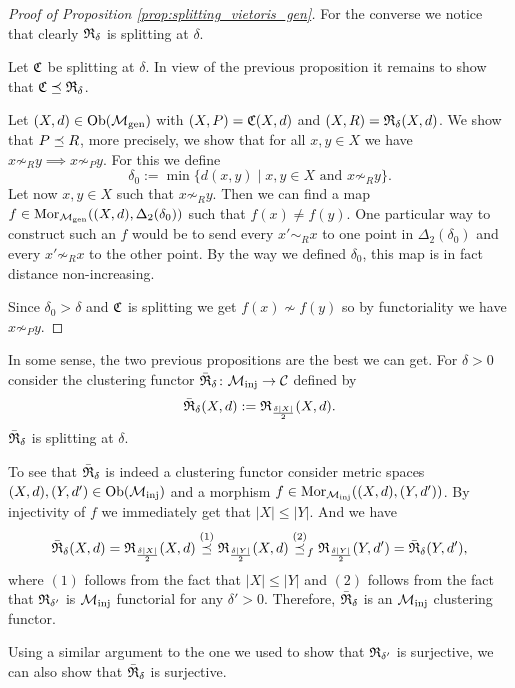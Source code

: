 \begin{proof}[Proof of Proposition \ref{prop:splitting_vietoris_gen}]
    For the converse we notice that clearly $\mathfrak{R}_\delta$ is splitting at $\delta$.

    \medskip
    Let $\mathfrak{C}$ be splitting at $\delta$. In view of the previous proposition it remains to show that $\mathfrak{C} \preceq \mathfrak{R}_\delta$.
        
    Let $(X,d) \in \mathrm {Ob}({\mathcal{M}_\mathrm{gen}})$ with $(X,P) = \mathfrak{C}(X,d)$ and $(X,R) = \mathfrak{R}_\delta(X,d)$. We show that $P \preceq R$, more precisely, we show that for all $x,y \in X$ we have $x \not\sim_R y \implies x \not\sim_P y$. For this we define
    $$
    \delta_0 := \min\{d(x,y) \mid x,y \in X \text{ and } x \not\sim_R y\}.
    $$
    Let now $x,y \in X$ such that $x \not\sim_R y$.
    Then we can find a map $f \in \mathrm {Mor}_{\mathcal{M}_\mathrm{gen}}((X,d), \Delta_2(\delta_0))$ such that $f(x) \neq f(y)$.
    One particular way to construct such an $f$ would be to send every $x' \sim_R x$ to one point in $\Delta_2(\delta_0)$ and every $x' \not\sim_R x$ to the other point. By the way we defined $\delta_0$, this map is in fact distance non-increasing.

    Since $\delta_0 > \delta$ and $\mathfrak{C}$ is splitting we get $f(x) \not\sim f(y)$ so by functoriality we have $x \not\sim_P y$.
\end{proof}


\begin{example}{}{}
In some sense, the two previous propositions are the best we can get.
For $\delta>0$ consider the clustering functor $\bar{\mathfrak{R}}_\delta\colon {\mathcal{M}_\mathrm{inj}} \to \mathcal{C}$ defined by
$$
\bar{\mathfrak{R}}_\delta(X,d) := \mathfrak{R}_{\frac{\delta|X|}{2}}(X,d).
$$
$\bar{\mathfrak{R}}_\delta$ is splitting at $\delta$.

\medskip
To see that $\bar{\mathfrak{R}}_\delta$ is indeed a clustering functor consider metric spaces ${(X,d), (Y,d') \in \mathrm {Ob}({\mathcal{M}_\mathrm{inj}})}$ and a morphism $f \in \mathrm {Mor}_{\mathcal{M}_\mathrm{inj}}((X,d), (Y,d'))$. By injectivity of $f$ we immediately get that $|X| \le |Y|$. And we have
$$
\bar{\mathfrak{R}}_\delta(X,d) = \mathfrak{R}_{\frac{\delta|X|}{2}}(X,d) \overset{(1)}{\preceq} \mathfrak{R}_{\frac{\delta|Y|}{2}}(X,d) \overset{(2)}{\preceq}_f \mathfrak{R}_{\frac{\delta|Y|}{2}}(Y,d') = \bar{\mathfrak{R}}_\delta(Y,d'),
$$
where $(1)$ follows from the fact that $|X| \le |Y|$ and $(2)$ follows from the fact that $\mathfrak{R}_{\delta'}$ is ${\mathcal{M}_\mathrm{inj}}$ functorial for any $\delta' > 0$. Therefore, $\bar{\mathfrak{R}}_\delta$ is an ${\mathcal{M}_\mathrm{inj}}$ clustering functor.

\medskip
Using a similar argument to the one we used to show that $\mathfrak{R}_{\delta'}$ is surjective, we can also show that $\bar{\mathfrak{R}}_\delta$ is surjective.
\end{example}

